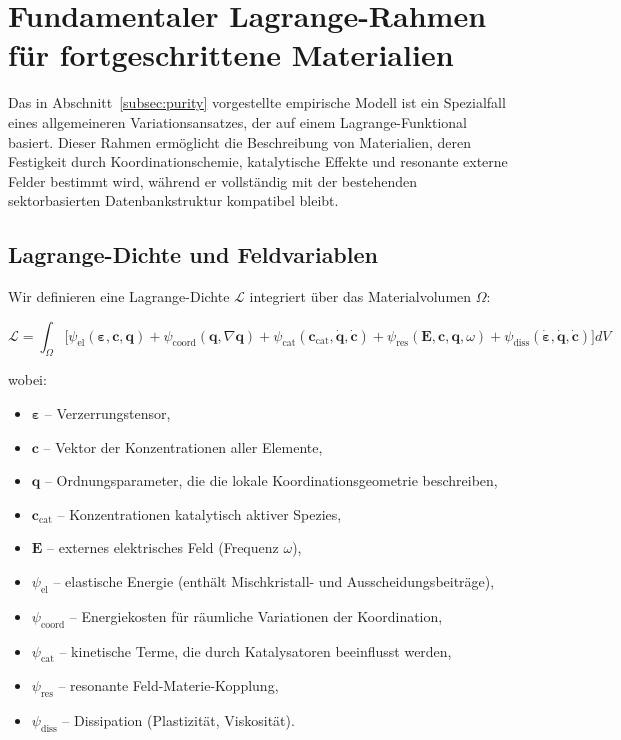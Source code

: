 \documentclass[12pt,a4paper]{article}
\begin{document}
\section{Fundamentaler Lagrange-Rahmen für fortgeschrittene Materialien}
\label{sec:lagrangian}

Das in Abschnitt~\ref{subsec:purity} vorgestellte empirische Modell ist ein Spezialfall eines allgemeineren Variationsansatzes, der auf einem Lagrange-Funktional basiert. Dieser Rahmen ermöglicht die Beschreibung von Materialien, deren Festigkeit durch Koordinationschemie, katalytische Effekte und resonante externe Felder bestimmt wird, während er vollständig mit der bestehenden sektorbasierten Datenbankstruktur kompatibel bleibt.

\subsection{Lagrange-Dichte und Feldvariablen}
\label{subsec:lagrangian-density}

Wir definieren eine Lagrange-Dichte \(\mathcal{L}\) integriert über das Materialvolumen \(\Omega\):

\[
\mathcal{L} = \int_{\Omega} \Big[ 
\psi_{\mathrm{el}}(\boldsymbol{\varepsilon}, \mathbf{c}, \mathbf{q}) 
+ \psi_{\mathrm{coord}}(\mathbf{q}, \nabla\mathbf{q}) 
+ \psi_{\mathrm{cat}}(\mathbf{c}_{\mathrm{cat}}, \dot{\mathbf{q}}, \dot{\mathbf{c}}) 
+ \psi_{\mathrm{res}}(\mathbf{E}, \mathbf{c}, \mathbf{q}, \omega) 
+ \psi_{\mathrm{diss}}(\dot{\boldsymbol{\varepsilon}}, \dot{\mathbf{q}}, \dot{\mathbf{c}})
\Big] dV
\]

wobei:
\begin{itemize}
\item \(\boldsymbol{\varepsilon}\) – Verzerrungstensor,
\item \(\mathbf{c}\) – Vektor der Konzentrationen aller Elemente,
\item \(\mathbf{q}\) – Ordnungsparameter, die die lokale Koordinationsgeometrie beschreiben,
\item \(\mathbf{c}_{\mathrm{cat}}\) – Konzentrationen katalytisch aktiver Spezies,
\item \(\mathbf{E}\) – externes elektrisches Feld (Frequenz \(\omega\)),
\item \(\psi_{\mathrm{el}}\) – elastische Energie (enthält Mischkristall- und Ausscheidungsbeiträge),
\item \(\psi_{\mathrm{coord}}\) – Energiekosten für räumliche Variationen der Koordination,
\item \(\psi_{\mathrm{cat}}\) – kinetische Terme, die durch Katalysatoren beeinflusst werden,
\item \(\psi_{\mathrm{res}}\) – resonante Feld-Materie-Kopplung,
\item \(\psi_{\mathrm{diss}}\) – Dissipation (Plastizität, Viskosität).
\end{itemize}
\end{document}
